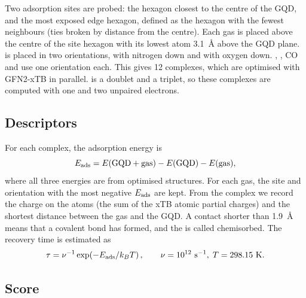 Two adsorption sites are probed: the hexagon closest to the centre of the GQD, and the most exposed
edge hexagon, defined as the hexagon with the fewest neighbours (ties broken by distance from the
centre). Each gas is placed above the centre of the site hexagon with its lowest atom 3.1~\AA{}
above the GQD plane.  is placed in two orientations, with nitrogen down and with oxygen
down. , , CO and  use one orientation each. This gives 12 complexes, which
are optimised with GFN2-xTB in parallel.  is a doublet and  a triplet, so these
complexes are computed with one and two unpaired electrons.

\subsection{Descriptors}

For each complex, the adsorption energy is
\begin{equation}
  E_{\mathrm{ads}} = E(\text{GQD}+\text{gas}) - E(\text{GQD}) - E(\text{gas}),
  \label{eq:eads}
\end{equation}
where all three energies are from optimised structures. For each gas, the site and orientation
with the most negative \(E_{\mathrm{ads}}\) are kept. From the  complex we record the charge on the
 atoms (the sum of the xTB atomic partial charges) and the shortest distance between the
gas and the GQD. A contact shorter than 1.9~\AA{} means that a covalent bond has formed, and the
 is called chemisorbed. The recovery time is estimated as
\begin{equation}
  \tau = \nu^{-1}\exp\!\left(-E_{\mathrm{ads}}/k_BT\right), \qquad \nu = 10^{12}~\text{s}^{-1},\; T = 298.15~\text{K}.
  \label{eq:tau}
\end{equation}

\subsection{Score}

